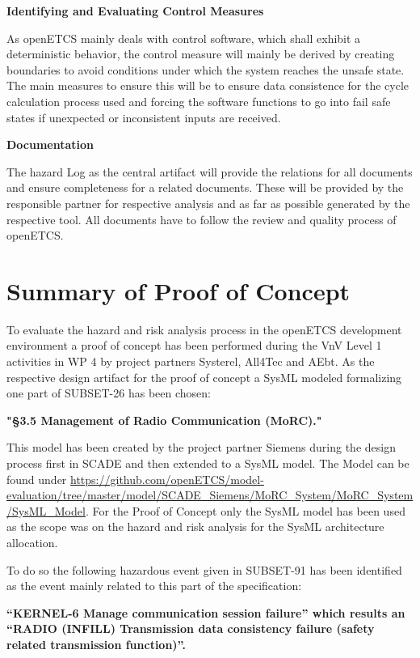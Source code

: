 \documentclass{template/openetcs_report}
\begin{document}
\textbf{Identifying and Evaluating Control Measures}

As openETCS mainly deals with control software, which shall exhibit a deterministic behavior, the control measure will mainly be derived by creating boundaries to avoid conditions under which the system reaches the unsafe state. The main measures to ensure this will be to ensure data consistence for the cycle calculation process used and forcing the software functions to go into fail safe states if unexpected or inconsistent inputs are received. 

\textbf{Documentation}

The hazard Log as the central artifact will provide the relations for all documents and ensure completeness for a related documents. These will be provided by the responsible partner for respective analysis and as far as possible generated by the respective tool. All documents have to follow the review and quality process of openETCS.

\section{Summary of Proof of Concept}
\label{sec:Proofofconcept}

To evaluate the hazard and risk analysis process in the openETCS development environment a proof of concept has been performed during the VnV Level 1 activities in WP 4 by project partners Systerel, All4Tec and AEbt. As the respective design artifact for the proof of concept a SysML modeled formalizing one part of SUBSET-26 has been chosen: 

\begin{center}
\textbf{"\S 3.5 Management of Radio Communication (MoRC)."}
\end{center}

This model has been created by the project partner Siemens during the design process first in SCADE and then extended to a SysML model. The Model can be found under \url{https://github.com/openETCS/model-evaluation/tree/master/model/SCADE_Siemens/MoRC_System/MoRC_System/SysML_Model}. For the Proof of Concept only the SysML model has been used as the scope was on the hazard and risk analysis for the SysML architecture allocation.

To do so the following hazardous event given in SUBSET-91 has been identified as the event mainly related to this part of the specification:
\begin{center}
\textbf{“KERNEL-6 Manage communication session failure” which results an “RADIO (INFILL) Transmission data consistency failure (safety related transmission function)”.}
\end{center}
\end{document}
